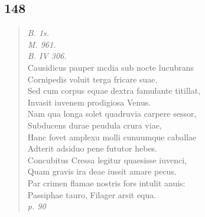 \documentclass[11pt, a4paper]{report}
\begin{document}
            \subsection*{148}
      \begin{verse}
      \textit{B. 1s.} \\ \textit{M. 961.} \\ \textit{B. IV 306.} \\ Causidicus pauper mcdia sub nocte lucubrans \\ Cornipedis voluit terga fricare suae. \\ Sed cum corpus equae dextra famulante titillat, \\ Invasit iuvenem prodigiosa Venus. \\ Nam qua longa solet quadruvia carpere sessor, \\ Subducens durae peudula crura viae, \\ Hanc fovet amplexu molli cunuumque caballae \\ Adterit adsiduo pene fututor hebes. \\ Concubitus Cressa legitur quaesisse iuvenci, \\ Quam gravis ira deae iussit amare pecus. \\ Par crimen flamae nostris fors intulit anuis: \\ Passiphae tauro, Filager arsit equa. \\ \textit{p. 90} \\ 
      \end{verse}
  
\end{document}

